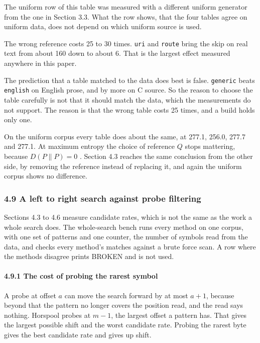 The uniform row of this table was measured with a different uniform generator from the one in Section 3.3. What the row shows, that the four tables agree on uniform data, does not depend on which uniform source is used.

The wrong reference costs 25 to 30 times. \texttt{uri} and \texttt{route} bring the skip on real text from about 160 down to about 6. That is the largest effect measured anywhere in this paper.

The prediction that a table matched to the data does best is false. \texttt{generic} beats \texttt{english} on English prose, and by more on C source. So the reason to choose the table carefully is not that it should match the data, which the measurements do not support. The reason is that the wrong table costs 25 times, and a build holds only one.

On the uniform corpus every table does about the same, at 277.1, 256.0, 277.7 and 277.1. At maximum entropy the choice of reference \(Q\) stops mattering, because \(D(P\|P) = 0\) \cite{src:Kullback}. Section 4.3 reaches the same conclusion from the other side, by removing the reference instead of replacing it, and again the uniform corpus shows no difference.

\subsubsection{4.9 A left to right search against probe filtering}

Sections 4.3 to 4.6 measure candidate rates, which is not the same as the work a whole search does. The whole-search bench runs every method on one corpus, with one set of patterns and one counter, the number of symbols read from the data, and checks every method's matches against a brute force scan. A row where the methods disagree prints BROKEN and is not used.

\paragraph{4.9.1 The cost of probing the rarest symbol}

A probe at offset \(a\) can move the search forward by at most \(a+1\), because beyond that the pattern no longer covers the position read, and the read says nothing. Horspool \cite{src:Horspool} probes at \(m-1\), the largest offset a pattern has. That gives the largest possible shift and the worst candidate rate. Probing the rarest byte gives the best candidate rate and gives up shift.

